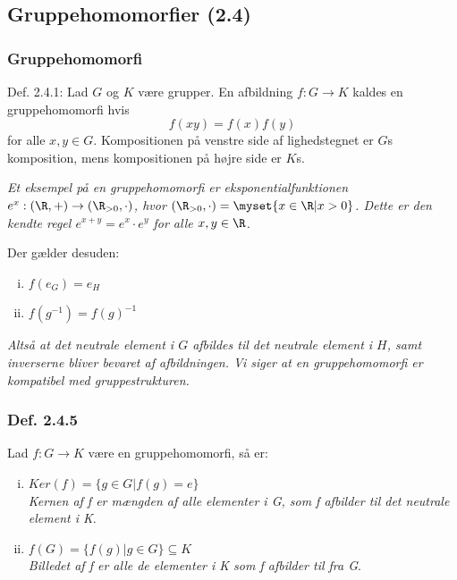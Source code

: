 \subsection{Gruppehomomorfier (2.4)}
\subsubsection{Gruppehomomorfi}
\label{Gruppehomomorfi}
Def. 2.4.1: Lad $G$ og $K$ være grupper. En afbildning $f: G \rightarrow K$
kaldes en gruppehomomorfi hvis
\begin{equation*}
  f(xy) = f(x)f(y)
\end{equation*}
for alle $x,y \in G$. Kompositionen på venstre side af lighedstegnet er $G$s
komposition, mens kompositionen på højre side er $K$s.

\textit{Et eksempel på en gruppehomomorfi er eksponentialfunktionen $e^x :
(\R,+) \rightarrow (\R_{>0}, \cdot)$, hvor $(\R_{>0}, \cdot) = \myset{x \in \R
| x > 0}$. Dette er den kendte regel $e^{x + y} = e^x \cdot e^y$ for alle $x,y
\in \R$.}

\newpage
Der gælder desuden:
\begin{enumerate}[(i)]
  \item $f(e_{G}) = e_H$
  \item $f(g^{-1}) = f(g)^{-1}$
\end{enumerate}

\textit{Altså at det neutrale element i $G$ afbildes til det neutrale element i
$H$, samt inverserne bliver bevaret af afbildningen. Vi siger at en
gruppehomomorfi er kompatibel med gruppestrukturen.}

\subsubsection{Def. 2.4.5}
Lad $f: G \rightarrow K$ være en gruppehomomorfi, så er:
\begin{enumerate}[(i)]
  \item $Ker(f) = \{g \in G | f(g) = e\}$\\
  \textit{Kernen af f er mængden af alle elementer i G, som f afbilder til det
  neutrale element i K}.
  \item $f(G) = \{f(g) | g \in G\} \subseteq K$\\
  \textit{Billedet af f er alle de elementer i K som f afbilder til fra G}.
\end{enumerate}

